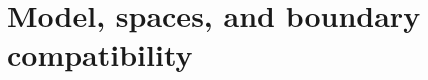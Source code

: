 \documentclass[11pt,a4paper]{article}
\theoremstyle{definition}
\numberwithin{equation}{section}
\begin{document}
%
%

\section{Model, spaces, and boundary compatibility}\label{sec:model}
\end{document}
